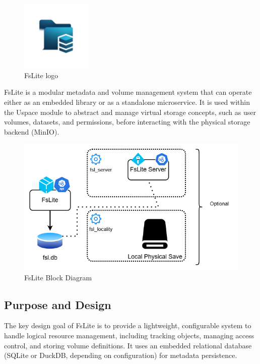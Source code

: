 \begin{figure}[h]
  \centering
  \includegraphics[width=0.3\textwidth]{Images/fslite_chatgpt_draft1.png}
  \caption{FsLite logo}
  \label{fig:fslogo}
\end{figure}


FsLite is a modular metadata and volume management system that can operate either as an embedded library or as a standalone microservice. It is used within the Uspace module to abstract and manage virtual storage concepts, such as user volumes, datasets, and permissions, before interacting with the physical storage backend (MinIO).

\begin{figure}[h!]
  \centering
  \includegraphics[width=1\textwidth]{Images/fsl.png}
  \caption{FsLite Block Diagram}
  \label{fig:fslite-blockdiagram}
\end{figure}

\subsection{Purpose and Design}

The key design goal of FsLite is to provide a lightweight, configurable system to handle logical resource management, including tracking objects, managing access control, and storing volume definitions. It uses an embedded relational database (SQLite or DuckDB, depending on configuration) for metadata persistence.

